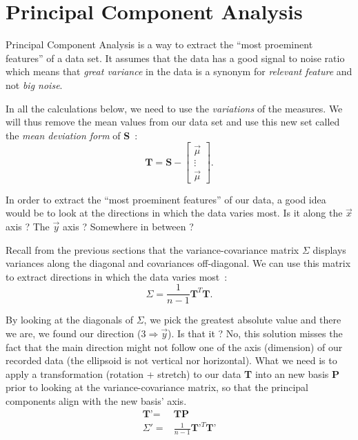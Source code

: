 \documentclass[11pt,twocolumn]{amsart} %
\begin{document}
\section{Principal Component Analysis}

Principal Component Analysis is a way to extract the ``most proeminent features'' of a data set. It assumes that the data has a good signal to noise ratio which means that \emph{great variance} in the data is a synonym for \emph{relevant feature} and not \emph{big noise}.

In all the calculations below, we need to use the \emph{variations} of the measures. We will thus remove the mean values from our data set and use this new set called the \emph{mean deviation form} of \textbf{S}~:
\begin{equation*}
  \textbf{T} = \textbf{S} - \begin{bmatrix}\vec{\mu} \\ \vdots \\ \vec{\mu}\end{bmatrix}.
\end{equation*}

In order to extract the ``most proeminent features'' of our data, a good idea would be to look at the directions in which the data varies most. Is it along the $\vec{x}$ axis ? The $\vec{y}$ axis ? Somewhere in between ?

Recall from the previous sections that the variance-covariance matrix $\Sigma$ displays variances along the diagonal and covariances off-diagonal. We can use this matrix to extract directions in which the data varies most~:
\begin{equation*}
  \Sigma = \frac{1}{n-1}\textbf{T}^T\textbf{T}.
\end{equation*}

By looking at the diagonals of $\Sigma$, we pick the greatest absolute value and there we are, we found our direction ($3 \Rightarrow \vec{y}$). Is that it ? No, this solution misses the fact that the main direction might not follow one of the axis (dimension) of our recorded data (the ellipsoid is not vertical nor horizontal). What we need is to apply a transformation (rotation + stretch) to our data \textbf{T} into an new basis \textbf{P} prior to looking at the variance-covariance matrix, so that the principal components align with the new basis' axis.
\begin{align*}
  \textbf{T'} = & \textbf{T}\textbf{P} \\
  \Sigma'     = & \frac{1}{n-1}\textbf{T'}^T\textbf{T'}
\end{align*}
\end{document}
